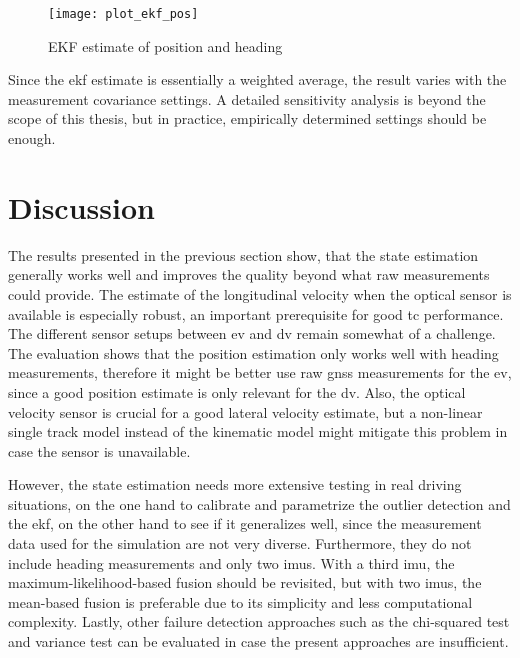 \begin{figure}[t]
	\centering
	\texttt{[image: plot\_ekf\_pos]}%
	\caption{EKF estimate of position and heading}
	\label{fig:ekf-position}
\end{figure}

Since the \gls{ekf} estimate is essentially a weighted average, the result varies with the measurement covariance settings. A detailed sensitivity analysis is beyond the scope of this thesis, but in practice, empirically determined settings should be enough.

\section{Discussion}
The results presented in the previous section show, that the state estimation generally works well and improves the quality beyond what raw measurements could provide. The estimate of the longitudinal velocity when the optical sensor is available is especially robust, an important prerequisite for good \gls{tc} performance. The different sensor setups between \gls{ev} and \gls{dv} remain somewhat of a challenge. The evaluation shows that the position estimation only works well with heading measurements, therefore it might be better use raw \gls{gnss} measurements for the \gls{ev}, since a good position estimate is only relevant for the \gls{dv}. Also, the optical velocity sensor is crucial for a good lateral velocity estimate, but a non-linear single track model instead of the kinematic model might mitigate this problem in case the sensor is unavailable.

However, the state estimation needs more extensive testing in real driving situations, on the one hand to calibrate and parametrize the outlier detection and the \gls{ekf}, on the other hand to see if it generalizes well, since the measurement data used for the simulation are not very diverse. Furthermore, they do not include heading measurements and only two \glspl{imu}. With a third \gls{imu}, the maximum-likelihood-based fusion should be revisited, but with two \glspl{imu}, the mean-based fusion is preferable due to its simplicity and less computational complexity. Lastly, other failure detection approaches such as the chi-squared test and variance test can be evaluated in case the present approaches are insufficient.
